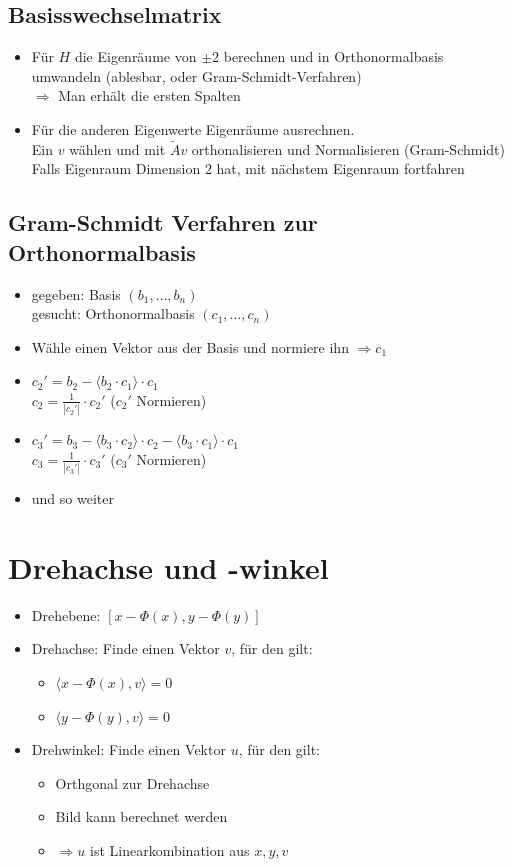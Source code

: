 \documentclass[a4paper,portrait]{scrartcl}
\begin{document}
\subsection{Basisswechselmatrix}
\begin{itemize}
	\item Für $H$ die Eigenräume von $\pm 2$ berechnen und in Orthonormalbasis umwandeln (ablesbar, oder Gram-Schmidt-Verfahren) \\
	$\Rightarrow$ Man erhält die ersten Spalten
	\item Für die anderen Eigenwerte Eigenräume ausrechnen.\\
	Ein $v$ wählen und mit $\tilde{A}v$ orthonalisieren und Normalisieren (Gram-Schmidt) \\
	Falls Eigenraum Dimension $2$ hat, mit nächstem Eigenraum fortfahren
\end{itemize}
\subsection{Gram-Schmidt Verfahren zur Orthonormalbasis}
\begin{itemize}
	\item gegeben: Basis $(b_1, \hdots ,b_n)$ \\
		gesucht: Orthonormalbasis $(c_1, \hdots ,c_n)$
	\item Wähle einen Vektor aus der Basis und normiere ihn $\Rightarrow c_1$
	\item $c_2' = b_2 - \langle b_2 \cdot c_1 \rangle \cdot c_1$ \\
		$c_2 = \frac{1}{|c_2'|}\cdot c_2'$ ($c_2'$ Normieren)
	\item $c_3' = b_3 - \langle b_3 \cdot c_2 \rangle \cdot c_2 - \langle b_3 \cdot c_1 \rangle \cdot c_1$ \\
	$c_3 = \frac{1}{|c_3'|}\cdot c_3'$ ($c_3'$ Normieren)
	\item und so weiter
\end{itemize}

\section{Drehachse und -winkel}
\begin{itemize}

\item Drehebene: $[x-\Phi(x),y-\Phi(y)]$ 
\item Drehachse: Finde einen Vektor $v$, für den gilt:
\begin{itemize}
	\item $\langle x-\Phi(x),v\rangle=0$
	\item $\langle y-\Phi(y),v\rangle=0$
\end{itemize}
\item Drehwinkel: Finde einen Vektor $u$, für den gilt:
\begin{itemize}
	\item Orthgonal zur Drehachse
	\item Bild kann berechnet werden
	\item $\Rightarrow u$ ist Linearkombination aus $x,y,v$
\end{itemize}
\end{itemize}
\end{document}
